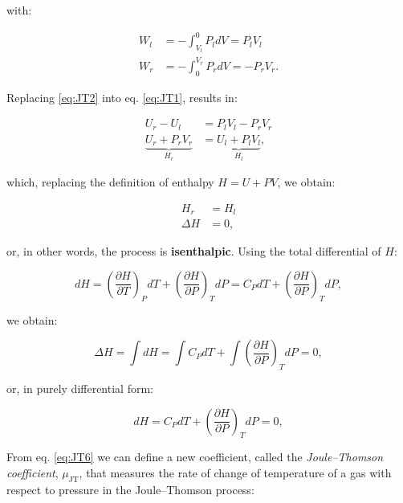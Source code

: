 \documentclass[
  9pt,
]{extbook}
\theoremstyle{definition}
\theoremstyle{definition}
\theoremstyle{definition}
\theoremstyle{definition}
\theoremstyle{remark}
\begin{document}
with:

\begin{equation}
\begin{aligned}
W_l &=-\int_{V_l}^0 P_l dV = P_l V_l\\
W_r &=-\int_0^{V_r} P_r dV = - P_r V_r.
\end{aligned}
\label{eq:JT2}
\end{equation}

Replacing \eqref{eq:JT2} into eq. \eqref{eq:JT1}, results in:

\begin{equation}
\begin{aligned}
U_r-U_l &=P_l V_l-P_r V_r \\
\underbrace{U_r+P_r V_r}_{H_r} &= \underbrace{U_l + P_l V_l}_{H_l},
\end{aligned}
\label{eq:JT3}
\end{equation}

which, replacing the definition of enthalpy \(H=U+PV\), we obtain:

\begin{equation}
\begin{aligned}
H_r &=H_l \\
\Delta H &=0,
\end{aligned}
\label{eq:JT4}
\end{equation}

or, in other words, the process is \textbf{isenthalpic}. Using the total differential of \(H\):

\begin{equation}
dH=\left(\frac{\partial H}{\partial T} \right)_P dT + \left(\frac{\partial H}{\partial P} \right)_T dP = C_P dT + \left(\frac{\partial H}{\partial P} \right)_T dP,
\label{eq:JT5}
\end{equation}

we obtain:

\begin{equation}
\Delta H=\int dH = \int C_P dT + \int \left(\frac{\partial H}{\partial P} \right)_T dP =0,
\label{eq:JT6b}
\end{equation}

or, in purely differential form:

\begin{equation}
dH = C_P dT + \left(\frac{\partial H}{\partial P} \right)_T dP =0,
\label{eq:JT6}
\end{equation}

From eq. \eqref{eq:JT6} we can define a new coefficient, called the \emph{Joule--Thomson coefficient}, \(\mu_{\mathrm{JT}}\), that measures the rate of change of temperature of a gas with respect to pressure in the Joule--Thomson process:
\end{document}
